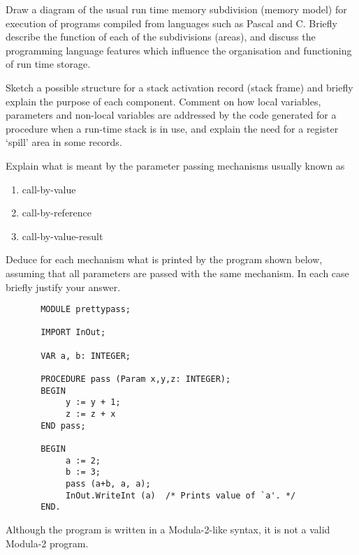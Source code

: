 \question

\begin{subquestions}
\subquestion
Draw a diagram of the usual run time memory
subdivision (memory model) for execution of
programs compiled from languages such as
Pascal and C.  Briefly describe the function of each
of the subdivisions (areas), and discuss
the programming language features which influence
the organisation and functioning of run time storage.

\subquestion
Sketch a possible structure for a stack activation
record (stack frame) and briefly explain the purpose of
each component. Comment on how local variables,
parameters and non-local variables
are addressed by the code generated for a
procedure when a run-time stack is in use,
and explain the need for a register `spill' area
in some records.

\subquestion

        Explain what is meant by the parameter passing mechanisms usually
        known as
                \begin{enumerate}
                \item call-by-value
                \item call-by-reference
                \item call-by-value-result
                \end{enumerate}
        Deduce for each mechanism what is printed by the 
        program shown below, assuming that all parameters are
	passed with the same mechanism.
        In each case briefly justify your answer.
\begin{verbatim}
       MODULE prettypass; 
       
       IMPORT InOut;

       VAR a, b: INTEGER;
 
       PROCEDURE pass (Param x,y,z: INTEGER);
       BEGIN
            y := y + 1;
            z := z + x
       END pass;
               
       BEGIN
            a := 2;
            b := 3;
            pass (a+b, a, a);
            InOut.WriteInt (a)  /* Prints value of `a'. */
       END.
\end{verbatim}                   
Although the program is written in a Modula-2-like syntax, it
is not a valid Modula-2 program.

\end{subquestions}
